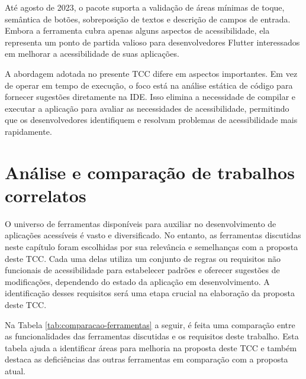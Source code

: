 Até agosto de 2023, o pacote suporta a validação de áreas mínimas de toque, semântica de botões, sobreposição de textos e descrição de campos de entrada. Embora a ferramenta cubra apenas alguns aspectos de acessibilidade, ela representa um ponto de partida valioso para desenvolvedores Flutter interessados em melhorar a acessibilidade de suas aplicações.

A abordagem adotada no presente TCC difere em aspectos importantes. Em vez de operar em tempo de execução, o foco está na análise estática de código para fornecer sugestões diretamente na IDE. Isso elimina a necessidade de compilar e executar a aplicação para avaliar as necessidades de acessibilidade, permitindo que os desenvolvedores identifiquem e resolvam problemas de acessibilidade mais rapidamente.

\section{Análise e comparação de trabalhos correlatos}

O universo de ferramentas disponíveis para auxiliar no desenvolvimento de aplicações acessíveis é vasto e diversificado. No entanto, as ferramentas discutidas neste capítulo foram escolhidas por sua relevância e semelhanças com a proposta deste TCC. Cada uma delas utiliza um conjunto de regras ou requisitos não funcionais de acessibilidade para estabelecer padrões e oferecer sugestões de modificações, dependendo do estado da aplicação em desenvolvimento. A identificação desses requisitos será uma etapa crucial na elaboração da proposta deste TCC.

Na Tabela \ref{tab:comparacao-ferramentas} a seguir, é feita uma comparação entre as funcionalidades das ferramentas discutidas e os requisitos deste trabalho. Esta tabela ajuda a identificar áreas para melhoria na proposta deste TCC e também destaca as deficiências das outras ferramentas em comparação com a proposta atual.

